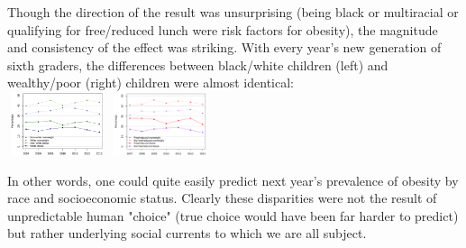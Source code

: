 \begin{multicols}{2}
Though the direction of the result was unsurprising (being black or multiracial or qualifying for free/reduced lunch were risk factors for obesity), the magnitude and consistency of the effect was striking.  With every year's new generation of sixth graders, the differences between black/white children (left) and wealthy/poor (right) children were almost identical:\\

\vspace{2mm}
\includegraphics[height=70, width=110]{alachua2.png}
\includegraphics[height=70, width=110]{alachua4.png}
\vspace{2mm}


In other words, one could quite easily predict next year's prevalence of obesity by race and socioeconomic status.  Clearly these disparities were not the result of unpredictable human "choice" (true choice would have been far harder to predict) but rather underlying social currents to which we are all subject.


\end{multicols}
